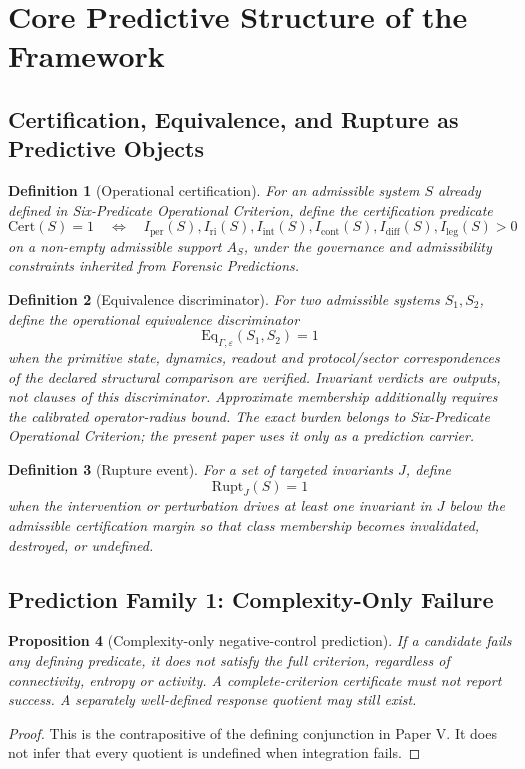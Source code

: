 \documentclass[11pt,a4paper]{article}
\newtheorem{proposition}{Proposition}[section]
\newtheorem{definition}[proposition]{Definition}
\newcommand{\Iper}{I_{\mathrm{per}}}
\newcommand{\Iri}{I_{\mathrm{ri}}}
\newcommand{\Iint}{I_{\mathrm{int}}}
\newcommand{\Icont}{I_{\mathrm{cont}}}
\newcommand{\Idiff}{I_{\mathrm{diff}}}
\newcommand{\Ileg}{I_{\mathrm{leg}}}
\newcommand{\Aset}{A_S}
\newcommand{\eps}{\varepsilon}
\newcommand{\Cert}{\mathrm{Cert}}
\newcommand{\Eq}{\mathrm{Eq}}
\newcommand{\Rupt}{\mathrm{Rupt}}
\begin{document}
\section{Core Predictive Structure of the Framework}
\subsection{Certification, Equivalence, and Rupture as Predictive Objects}
\begin{definition}[Operational certification]
For an admissible system $S$ already defined in \textit{Six-Predicate Operational Criterion}, define the certification predicate
\[
\Cert(S)=1
\quad\Longleftrightarrow\quad
\Iper(S),\Iri(S),\Iint(S),\Icont(S),\Idiff(S),\Ileg(S) > 0
\]
on a non-empty admissible support $\Aset$, under the governance and admissibility constraints inherited from \textit{Forensic Predictions}.
\end{definition}

\begin{definition}[Equivalence discriminator]
For two admissible systems $S_1,S_2$, define the operational equivalence discriminator
\[
\Eq_{\Gamma,\eps}(S_1,S_2)=1
\]
when the primitive state, dynamics, readout and protocol/sector correspondences of the declared structural comparison are verified. Invariant verdicts are outputs, not clauses of this discriminator. Approximate membership additionally requires the calibrated operator-radius bound. The exact burden belongs to \textit{Six-Predicate Operational Criterion}; the present paper uses it only as a prediction carrier.
\end{definition}

\begin{definition}[Rupture event]
For a set of targeted invariants $J$, define
\[
\Rupt_J(S)=1
\]
when the intervention or perturbation drives at least one invariant in $J$ below the admissible certification margin so that class membership becomes invalidated, destroyed, or undefined.
\end{definition}

\subsection{Prediction Family 1: Complexity-Only Failure}
\begin{proposition}[Complexity-only negative-control prediction]\label{prop:complexity-contract}
If a candidate fails any defining predicate, it does not satisfy the full criterion, regardless of connectivity, entropy or activity. A complete-criterion certificate must not report success. A separately well-defined response quotient may still exist.
\end{proposition}
\begin{proof}
This is the contrapositive of the defining conjunction in Paper V. It does not infer that every quotient is undefined when integration fails.
\end{proof}
\end{document}
